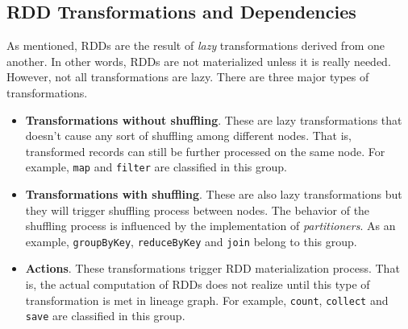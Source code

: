 \clearpage
\subsection{RDD Transformations and Dependencies}
\label{sp:depend}

As mentioned, RDDs are the result of \emph{lazy} transformations derived from one another. In other words, RDDs are not materialized unless it is really needed. However, not all transformations are lazy. There are three major types of transformations.
\begin{itemize}
    \item \textbf{Transformations without shuffling}. These are lazy transformations that doesn't cause any sort of shuffling among different nodes. That is, transformed records can still be further processed on the same node. For example, \lstinline$map$ and \lstinline$filter$ are classified in this group.
    \item \textbf{Transformations with shuffling}. These are also lazy transformations but they will trigger shuffling process between nodes. The behavior of the shuffling process is influenced by the implementation of \emph{partitioners}. As an example, \lstinline$groupByKey$, \lstinline$reduceByKey$ and \lstinline$join$ belong to this group.
    \item \textbf{Actions}. These transformations trigger RDD materialization process. That is, the actual computation of RDDs does not realize until this type of transformation is met in lineage graph. For example, \lstinline$count$, \lstinline$collect$ and \lstinline$save$ are classified in this group.
\end{itemize}

